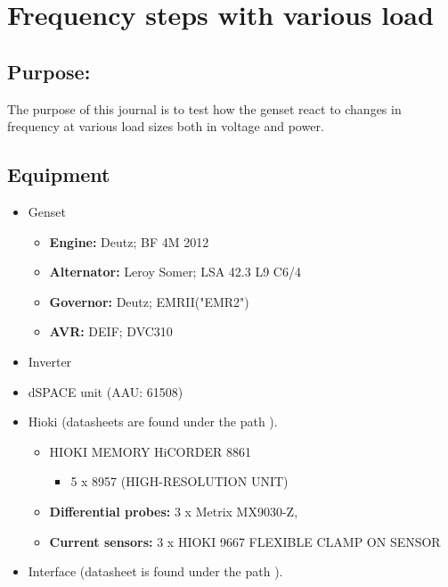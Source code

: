 \section{Frequency steps with various load}
\label{app:Frequency_steps}
\subsection*{Purpose:}
The purpose of this journal is to test how the genset react to changes in frequency at various load sizes both in voltage and power. 

\subsection*{Equipment}

\begin{itemize}
	\item Genset
		\begin{itemize}
			\item \textbf{Engine:} Deutz; BF 4M 2012
			\item \textbf{Alternator:} Leroy Somer; LSA 42.3 L9 C6/4
			\item \textbf{Governor:} Deutz; EMRII("EMR2")
			\item \textbf{AVR:} DEIF; DVC310 
		\end{itemize}
		\item Inverter
		\item dSPACE unit (AAU: 61508)
		\item Hioki (datasheets are found under the path ).
		\begin{itemize}
			\item HIOKI MEMORY HiCORDER 8861
			\begin{itemize}
				\item 5 x 8957 (HIGH-RESOLUTION UNIT)
			\end{itemize}
			\item \textbf{Differential probes:} 3 x Metrix MX9030-Z,
			\item \textbf{Current sensors:} 3 x HIOKI 9667 FLEXIBLE CLAMP ON SENSOR
		\end{itemize}
		\item Interface (datasheet is found under the path ).
\end{itemize}	


